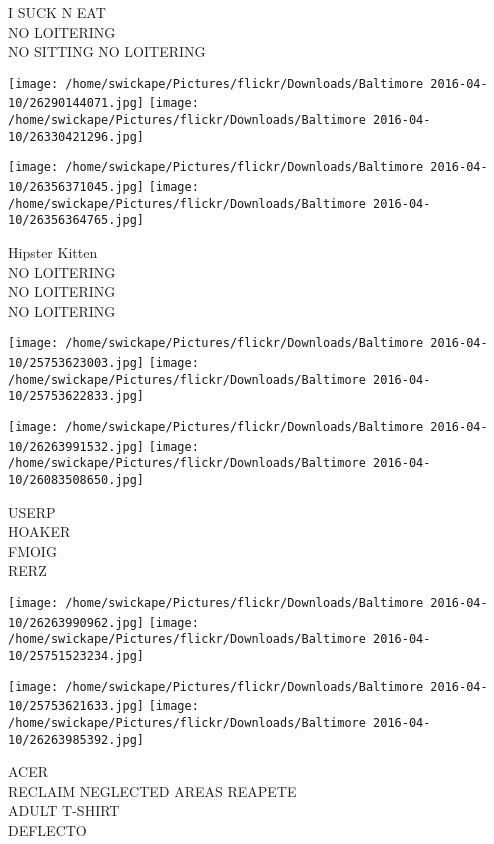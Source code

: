 \documentclass[10pt,letterpaper]{article}
\begin{document}
I SUCK N EAT\\
NO LOITERING\\
NO SITTING NO LOITERING\\
\pagebreak

\texttt{[image: /home/swickape/Pictures/flickr/Downloads/Baltimore 2016-04-10/26290144071.jpg]}
\texttt{[image: /home/swickape/Pictures/flickr/Downloads/Baltimore 2016-04-10/26330421296.jpg]}

\texttt{[image: /home/swickape/Pictures/flickr/Downloads/Baltimore 2016-04-10/26356371045.jpg]}
\texttt{[image: /home/swickape/Pictures/flickr/Downloads/Baltimore 2016-04-10/26356364765.jpg]}

Hipster Kitten\\
NO LOITERING\\
NO LOITERING\\
NO LOITERING\\
\pagebreak

\texttt{[image: /home/swickape/Pictures/flickr/Downloads/Baltimore 2016-04-10/25753623003.jpg]}
\texttt{[image: /home/swickape/Pictures/flickr/Downloads/Baltimore 2016-04-10/25753622833.jpg]}

\texttt{[image: /home/swickape/Pictures/flickr/Downloads/Baltimore 2016-04-10/26263991532.jpg]}
\texttt{[image: /home/swickape/Pictures/flickr/Downloads/Baltimore 2016-04-10/26083508650.jpg]}

USERP\\
HOAKER\\
FMOIG\\
RERZ\\
\pagebreak

\texttt{[image: /home/swickape/Pictures/flickr/Downloads/Baltimore 2016-04-10/26263990962.jpg]}
\texttt{[image: /home/swickape/Pictures/flickr/Downloads/Baltimore 2016-04-10/25751523234.jpg]}

\texttt{[image: /home/swickape/Pictures/flickr/Downloads/Baltimore 2016-04-10/25753621633.jpg]}
\texttt{[image: /home/swickape/Pictures/flickr/Downloads/Baltimore 2016-04-10/26263985392.jpg]}

ACER\\
RECLAIM NEGLECTED AREAS REAPETE\\
ADULT T{-}SHIRT\\
DEFLECTO\\
\pagebreak
\end{document}
